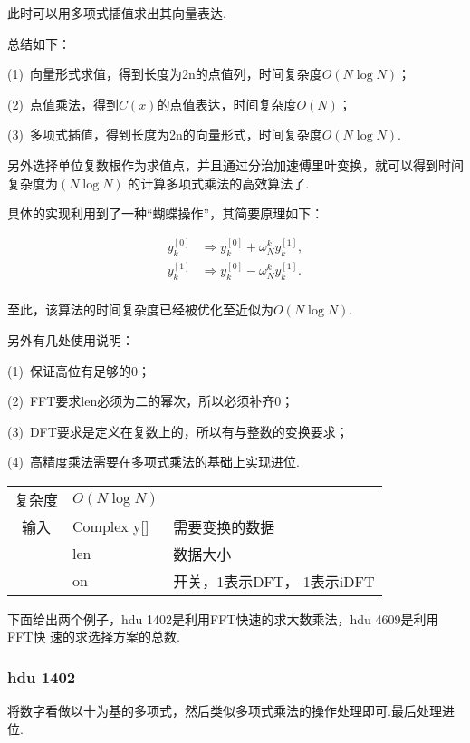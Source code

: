 此时可以用多项式插值求出其向量表达.

总结如下：

(1)\ 向量形式求值，得到长度为2n的点值列，时间复杂度$O(N \log N)$；

(2)\ 点值乘法，得到$C(x)$的点值表达，时间复杂度$O(N)$；

(3)\ 多项式插值，得到长度为2n的向量形式，时间复杂度$O(N \log N)$.

另外选择单位复数根作为求值点，并且通过分治加速傅里叶变换，就可以得到时间复杂度为$(N\log N)$
的计算多项式乘法的高效算法了.

具体的实现利用到了一种“蝴蝶操作”，其简要原理如下：

\begin{equation}
\begin{aligned}
y_{k}^{[0]} &\Rightarrow y_{k}^{[0]} + \omega ^{k}_{N}y_{k}^{[1]},\\
y_{k}^{[1]} &\Rightarrow y_{k}^{[0]} - \omega ^{k}_{N}y_{k}^{[1]}.\\
\end{aligned}
\end{equation}

至此，该算法的时间复杂度已经被优化至近似为$O(N \log N)$.

另外有几处使用说明：

(1)\ 保证高位有足够的0；

(2)\ FFT要求len必须为二的幂次，所以必须补齐0；

(3)\ DFT要求是定义在复数上的，所以有与整数的变换要求；

(4)\ 高精度乘法需要在多项式乘法的基础上实现进位.

\begin{longtable}{|c|l|l|}
复杂度 & $O(N\log N)$ &  \\
输入 & Complex y[] & 需要变换的数据 \\
 & len & 数据大小 \\
 & on & 开关，1表示DFT，-1表示iDFT \\
\end{longtable}
下面给出两个例子，hdu 1402是利用FFT快速的求大数乘法，hdu 4609是利用FFT快
速的求选择方案的总数.


        \subsubsection{hdu 1402}\small
将数字看做以十为基的多项式，然后类似多项式乘法的操作处理即可.最后处理进位.



